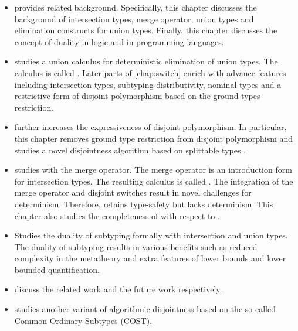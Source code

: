 \begin{itemize}
  \item {} provides related background.
      Specifically, this chapter discusses the background of
      intersection types, merge operator, union types and
      elimination constructs for union types. Finally,
      this chapter discusses the concept of duality in
      logic and in programming languages. 

  \item {} studies a union calculus for deterministic
      elimination of union types. The calculus is called \name.
      Later parts of \cref{chap:switch} enrich \name with advance
      features including intersection types, subtyping distributivity,
      nominal types and a restrictive form of disjoint polymorphism based
      on the ground types restriction.

  \item {} further increases the expressiveness
      of disjoint polymorphism. In particular, this chapter
      removes ground type restriction from disjoint polymorphism
      and studies a novel disjointness algorithm based on
      splittable types \citep{huang2021distributing}.

  \item {} studies \name with the merge operator.
      The merge operator \citep{oliveira2016disjoint,dunfield2014elaborating,reynolds1988preliminary}
      is an introduction form for intersection types.
      The resulting calculus is called \namems.
      The integration of the merge operator and disjoint
      switches result in novel challenges for
      determinism. Therefore, \namems retains type-safety
      but lacks determinism. This chapter also studies the
      completeness of \namems with respect to \cite{dunfield2014elaborating}.

  \item {} Studies the duality of subtyping formally
      with intersection and union types. The duality
      of subtyping results in various benefits such as reduced
      complexity in the metatheory and extra features of lower bounds
      and lower bounded quantification.


  \item {} discuss the related work
      and the future work respectively.

  \item {} studies another variant of algorithmic
      disjointness based on the so called Common Ordinary Subtypes
      (COST).
\end{itemize}

